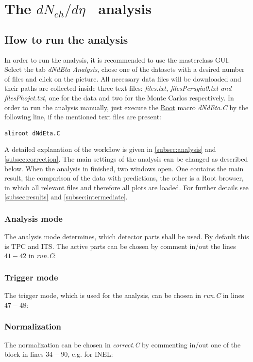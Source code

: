 \documentclass{article}
\newcommand\dNdEta{$dN_{ch}/d\eta$}
\begin{document}
\section{The \dNdEta~ analysis}

\subsection{How to run the analysis}
In order to run the analysis, it is recommended to use the masterclass GUI. Select the tab \textit{dNdEta Analysis}, chose one of the datasets with a desired number of files and click on the picture. All necessary data files will be downloaded and their paths are collected inside three text files: \textit{files.txt, filesPerugia0.txt and filesPhojet.txt}, one for the data and two for the Monte Carlos respectively. In order to run the analysis manually, just execute the \href{https://root.cern.ch/}{Root} macro \textit{dNdEta.C} by the following line, if the mentioned text files are present:
\begin{lstlisting}[numbers=none, language=bash]
aliroot dNdEta.C
\end{lstlisting}
A detailed explanation of the workflow is given in \ref{subsec:analysis} and \ref{subsec:correction}. The main settings of the analysis can be changed as described below. When the analysis in finished, two windows open. One contains the main result, the comparison of the data with predictions, the other is a Root browser, in which all relevant files and therefore all plots are loaded. For further details see \ref{subsec:results} and \ref{subsec:intermediate}.
\subsubsection*{Analysis mode}
The analysis mode determines, which detector parts shall be used. By default this is TPC and ITS. The active parts can be chosen by comment in/out the lines $41-42$ in \textit{run.C}:

\subsubsection*{Trigger mode}
The trigger mode, which is used for the analysis, can be chosen in \textit{run.C} in lines $47-48$:

\subsubsection*{Normalization}
The normalization can be chosen in \textit{correct.C} by commenting in/out one of the block in lines $34-90$, e.g. for INEL:

\end{document}
